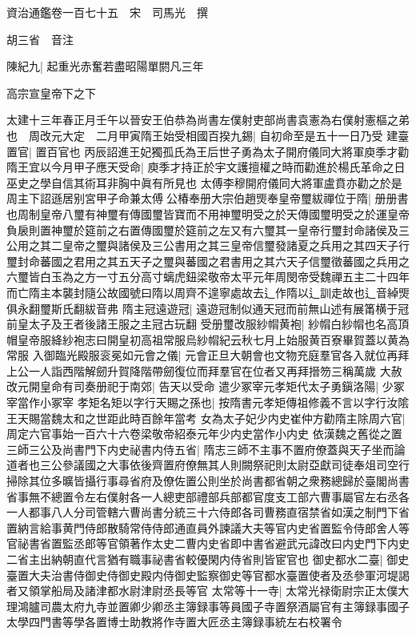 資治通鑑卷一百七十五　宋　司馬光　撰

胡三省　音注

陳紀九|{
	起重光赤奮若盡昭陽單閼凡三年}


高宗宣皇帝下之下

太建十三年春正月壬午以晉安王伯恭為尚書左僕射吏部尚書袁憲為右僕射憲樞之弟也　周改元大定　二月甲寅隋王始受相國百揆九錫|{
	自初命至是五十一日乃受}
建臺置官|{
	置百官也}
丙辰詔進王妃獨孤氏為王后世子勇為太子開府儀同大將軍庾季才勸隋王宜以今月甲子應天受命|{
	庾季才持正於宇文護擅權之時而勸進於楊氏革命之日巫史之學自信其術耳非胸中眞有所見也}
太傅李穆開府儀同大將軍盧賁亦勸之於是周主下詔遜居别宮甲子命兼太傅公椿奉册大宗伯趙煚奉皇帝璽紱禪位于隋|{
	册册書也周制皇帝八璽有神璽有傳國璽皆寶而不用神璽明受之於天傳國璽明受之於運皇帝負扆則置神璽於筵前之右置傳國璽於筵前之左又有六璽其一皇帝行璽封命諸侯及三公用之其二皇帝之璽與諸侯及三公書用之其三皇帝信璽發諸夏之兵用之其四天子行璽封命蕃國之君用之其五天子之璽與蕃國之君書用之其六天子信璽徵蕃國之兵用之六璽皆白玉為之方一寸五分高寸螭虎鈕梁敬帝太平元年周閔帝受魏禪五主二十四年而亡隋主本襲封隨公故國號曰隋以周齊不遑寧處故去辶作隋以辶訓走故也辶音綽煚俱永翻璽斯氏翻紱音弗}
隋主冠遠遊冠|{
	遠遊冠制似通天冠而前無山述有展筩横于冠前皇太子及王者後諸王服之主冠古玩翻}
受册璽改服紗㡌黄袍|{
	紗㡌白紗㡌也名高頂帽皇帝服絳紗袍志曰開皇初高祖常服烏紗㡌紀云秋七月上始服黄百寮畢賀蓋以黄為常服}
入御臨光殿服衮冕如元會之儀|{
	元會正旦大朝會也文物充庭羣官各入就位再拜上公一人詣西階解劒升賀降階帶劒復位而拜羣官在位者又再拜搢笏三稱萬歲}
大赦改元開皇命有司奏册祀于南郊|{
	告天以受命}
遣少冢宰元孝矩代太子勇鎭洛陽|{
	少冢宰當作小冢宰}
孝矩名矩以字行天賜之孫也|{
	按隋書元孝矩傳祖修義不言以字行汝隂王天賜當魏太和之世距此時百餘年當考}
女為太子妃少内史崔仲方勸隋主除周六官|{
	周定六官事始一百六十六卷梁敬帝紹泰元年少内史當作小内史}
依漢魏之舊從之置三師三公及尚書門下内史祕書内侍五省|{
	隋志三師不主事不置府僚蓋與天子坐而論道者也三公參議國之大事依後齊置府僚無其人則闕祭祀則太尉亞獻司徒奉俎司空行掃除其位多曠皆攝行事尋省府及僚佐置公則坐於尚書都省朝之衆務總歸於臺閣尚書省事無不總置令左右僕射各一人總吏部禮部兵部都官度支工部六曹事屬官左右丞各一人都事八人分司管轄六曹尚書分統三十六侍郎各司曹務直宿禁省如漢之制門下省置納言給事黄門侍郎散騎常侍侍郎通直員外諫議大夫等官内史省置監令侍郎舍人等官祕書省置監丞郎等官領著作太史二曹内史省即中書省避武元諱改曰内史門下内史二省主出納朝直代言猶有職事祕書省較優閑内侍省則皆宦官也}
御史都水二臺|{
	御史臺置大夫治書侍御史侍御史殿内侍御史監察御史等官都水臺置使者及丞參軍河堤謁者又領掌船局及諸津都水尉津尉丞長等官}
太常等十一寺|{
	太常光禄衛尉宗正太僕大理鴻臚司農太府九寺並置卿少卿丞主簿録事等員國子寺置祭酒屬官有主簿録事國子太學四門書等學各置博士助教將作寺置大匠丞主簿録事統左右校署令}
